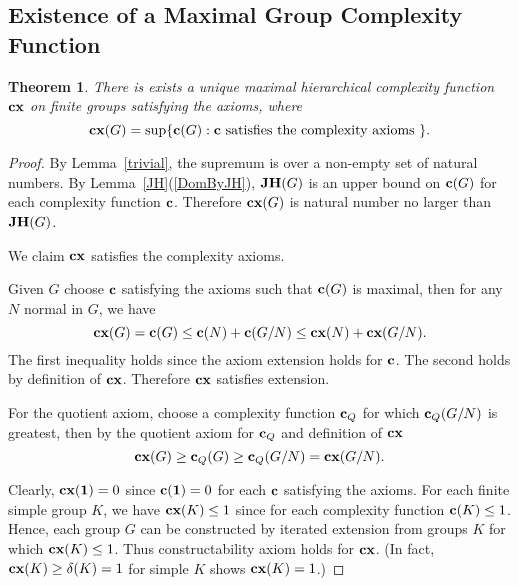 \documentclass[a4paper,11pt]{amsart}
\newtheorem{theorem}{Theorem}[section]
\theoremstyle{definition}
\newcommand{\cx}{\mbox{\bf cx}}
\renewcommand{\c}{\mbox{\bf c}}
\newcommand{\JH}{{\bf JH}}
\newcommand{\1}{{\mathbf 1}}
\begin{document}
\subsection{Existence of a Maximal Group Complexity Function}


\begin{theorem}\label{uniqueCpx}
There is exists a unique maximal hierarchical complexity function $\cx$ on finite groups satisfying the axioms, where 
$$\cx(G)= \sup \{\c(G) : \c \mbox{ satisfies the complexity axioms }\}. $$

\end{theorem}
\begin{proof} 
By Lemma~\ref{trivial}, the supremum is over a non-empty set of natural numbers. By Lemma~\ref{JH}(\ref{DomByJH}),  $\JH(G)$ is an upper bound on $\c(G)$ for each complexity function $\c$. Therefore $\cx(G)$ is natural number no larger than $\JH(G)$.

We claim $\cx$ satisfies the complexity axioms. 


Given $G$ choose $\c$ satisfying the axioms such that
$\c(G)$ is maximal,  then for any $N$ normal in $G$, we have $$\cx(G)=\c(G) \leq \c(N)+\c(G/N) \leq \cx(N) + \cx(G/N).$$
The first inequality holds since the axiom extension holds for $\c$.  The second holds by definition of $\cx$. Therefore $\cx$ satisfies  extension. 


For the quotient axiom, choose a complexity function $\c_Q$ for which $\c_Q(G/N)$ is greatest, then by the quotient axiom for $\c_Q$ and definition of $\cx$
$$\cx(G) \geq \c_Q(G) \geq \c_Q(G/N)=\cx(G/N).$$

Clearly, $\cx(\1)=0$ since $\c(\1)=0$ for each $\c$ satisfying the axioms.
For each finite simple group $K$, we have $\cx(K)\leq 1$ since for each complexity function $\c(K)\leq 1$.  Hence, each group
$G$ can be constructed by iterated extension from groups $K$ for which $\cx(K)\leq 1$. Thus constructability axiom holds for $\cx$. (In fact, $\cx(K)\geq \delta(K)=1$ for simple $K$ shows $\cx(K)=1$.)



\end{proof}
\end{document}
